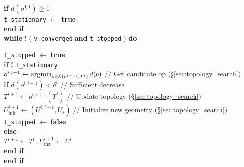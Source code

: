 \begin{algorithm}[t]
\hspace{10pt} \textbf{if} $d(o^{0,1}) \geq 0$ \\
\hspace{20pt} \texttt{t\_stationary} $\leftarrow$ \textbf{true}\\
\hspace{10pt} \textbf{end if} \\

\hspace{10pt} \textbf{while}  \textbf{!}  ( \texttt{v\_converged} \hspace{2pt} \textbf{and} \hspace{2pt}  \texttt{t\_stopped} ) \hspace{2pt}   \textbf{do} 

\hspace{20pt} \texttt{t\_stopped} $\leftarrow$ \textbf{true} \\
\hspace{20pt} \textbf{if}  \textbf{!} \texttt{t\_stationary} \\
\hspace{30pt} $o^{i,i+1} \leftarrow \operatorname*{argmin}_{o \in \mathcal{E}(o^{i-1, i}, T^i)} d(o)$ \hspace{3pt}// Get candidate op (\S\ref{sec:topology_search})  \\
\hspace{30pt} \textbf{if} $d(o^{i,i+1}) < \delta^{i}$ \hspace{10pt} // Sufficient decrease \\
\hspace{40pt} $T^{i+1} \leftarrow o^{i, i+1}(T^i)$ \hspace{10pt} // Update topology (\S\ref{sec:topology_search}) \\
\hspace{40pt} $U^{i+1}_\text{init} \leftarrow (U^{i,i+1}, U_s) $ \hspace{10pt} // Initialize new geometry (\S\ref{sec:topology_search}) \\
\hspace{40pt} \texttt{t\_stopped} $\leftarrow$ \textbf{false} \\
\hspace{30pt} \textbf{else} \\
\hspace{40pt} $T^{i+1} \leftarrow T^i$, \hspace{1pt} $U^{i+1}_\text{init} \leftarrow U^i $ \\
\hspace{30pt} \textbf{end if} \\
\hspace{20pt} \textbf{end if} \\


\end{algorithm}
